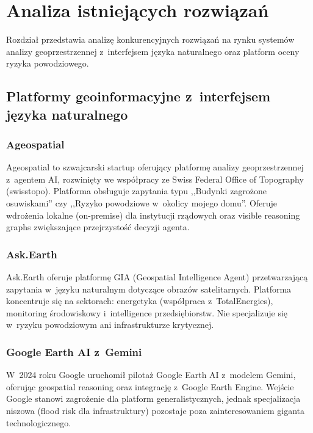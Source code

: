 \section{Analiza istniejących rozwiązań}
\label{chap:drugi}

Rozdział przedstawia analizę konkurencyjnych rozwiązań na rynku systemów analizy geoprzestrzennej z~interfejsem języka naturalnego oraz platform oceny ryzyka powodziowego.

\subsection{Platformy geoinformacyjne z~interfejsem języka naturalnego}

\subsubsection{Ageospatial}

Ageospatial to szwajcarski startup oferujący platformę analizy geoprzestrzennej z~agentem AI, rozwinięty we współpracy ze Swiss Federal Office of Topography (swisstopo). Platforma obsługuje zapytania typu ,,Budynki zagrożone osuwiskami'' czy ,,Ryzyko powodziowe w~okolicy mojego domu''. Oferuje wdrożenia lokalne (on-premise) dla instytucji rządowych oraz visible reasoning graphs zwiększające przejrzystość decyzji agenta.

\subsubsection{Ask.Earth}

Ask.Earth oferuje platformę GIA (Geospatial Intelligence Agent) przetwarzającą zapytania w~języku naturalnym dotyczące obrazów satelitarnych. Platforma koncentruje się na sektorach: energetyka (współpraca z~TotalEnergies), monitoring środowiskowy i~intelligence przedsiębiorstw. Nie specjalizuje się w~ryzyku powodziowym ani infrastrukturze krytycznej.

\subsubsection{Google Earth AI z~Gemini}

W~2024 roku Google uruchomił pilotaż Google Earth AI z~modelem Gemini, oferując geospatial reasoning oraz integrację z~Google Earth Engine. Wejście Google stanowi zagrożenie dla platform generalistycznych, jednak specjalizacja niszowa (flood risk dla infrastruktury) pozostaje poza zainteresowaniem giganta technologicznego.


